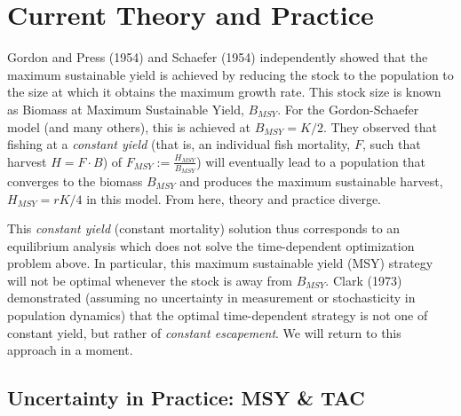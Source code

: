 \documentclass[3p]{elsarticle} %
\begin{document}
\hypertarget{current-theory-and-practice}{%
\section{Current Theory and
Practice}\label{current-theory-and-practice}}

Gordon and Press (1954) and Schaefer (1954) independently showed that
the maximum sustainable yield is achieved by reducing the stock to the
population to the size at which it obtains the maximum growth rate. This
stock size is known as Biomass at Maximum Sustainable Yield,
\(B_{MSY}\). For the Gordon-Schaefer model (and many others), this is
achieved at \(B_{MSY} = K/2\). They observed that fishing at a
\emph{constant yield} (that is, an individual fish mortality, \(F\),
such that harvest \(H = F \cdot B\)) of
\(F_{MSY} := \tfrac{H_{MSY}}{B_{MSY}}\)) will eventually lead to a
population that converges to the biomass \(B_{MSY}\) and produces the
maximum sustainable harvest, \(H_{MSY} = r K / 4\) in this model. From
here, theory and practice diverge.

This \emph{constant yield} (constant mortality) solution thus
corresponds to an equilibrium analysis which does not solve the
time-dependent optimization problem above. In particular, this maximum
sustainable yield (MSY) strategy will not be optimal whenever the stock
is away from \(B_{MSY}\). Clark (1973) demonstrated (assuming no
uncertainty in measurement or stochasticity in population dynamics) that
the optimal time-dependent strategy is not one of constant yield, but
rather of \emph{constant escapement}. We will return to this approach in
a moment.

\hypertarget{uncertainty-in-practice-msy-tac}{%
\subsection{Uncertainty in Practice: MSY \&
TAC}\label{uncertainty-in-practice-msy-tac}}
\end{document}
